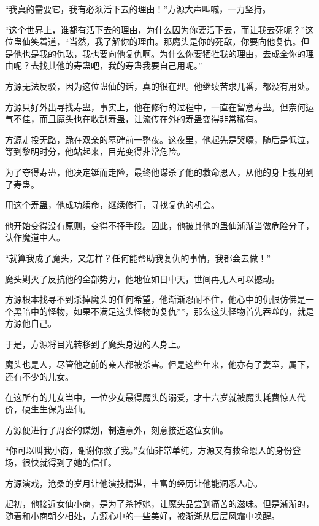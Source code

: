 
\begin{this_body}

“我真的需要它，我有必须活下去的理由！”方源大声叫喊，一力坚持。

“这个世界上，谁都有活下去的理由，为什么因为你要活下去，而让我去死呢？”这位蛊仙笑着道，“当然，我了解你的理由。那魔头是你的死敌，你要向他复仇。但是他也是我的仇敌，我也要向他复仇啊。为什么你要牺牲我的理由，去成全你的理由呢？去找其他的寿蛊吧，我的寿蛊我要自己用呢。”

方源无法反驳，因为这位蛊仙的话，真的很在理。他继续苦求几番，都没有用处。

方源只好外出寻找寿蛊，事实上，他在修行的过程中，一直在留意寿蛊。但奈何运气不佳，而且魔头也在收刮寿蛊，让流传在外的寿蛊变得非常稀有。

方源走投无路，跪在双亲的墓碑前一整夜。这夜里，他起先是哭嚎，随后是低泣，等到黎明时分，他站起来，目光变得非常危险。

为了夺得寿蛊，他决定铤而走险，最终他谋杀了他的救命恩人，从他的身上搜刮到了寿蛊。

用这个寿蛊，他成功续命，继续修行，寻找复仇的机会。

他开始变得没有原则，变得不择手段。因此，他被其他的蛊仙渐渐当做危险分子，认作魔道中人。

“就算我成了魔头，又怎样？任何能帮助我复仇的事情，我都会去做！”

魔头剿灭了反抗他的全部势力，他地位如日中天，世间再无人可以撼动。

方源根本找寻不到杀掉魔头的任何希望，他渐渐忍耐不住，他心中的仇恨仿佛是一个黑暗中的怪物，如果不满足这头怪物的复仇**，那么这头怪物首先吞噬的，就是方源他自己。

于是，方源将目光转移到了魔头身边的人身上。

魔头也是人，尽管他之前的亲人都被杀害。但是这些年来，他亦有了妻室，属下，还有不少的儿女。

在这所有的儿女当中，一位少女最得魔头的溺爱，才十六岁就被魔头耗费惊人代价，硬生生保为蛊仙。

方源便进行了周密的谋划，制造意外，刻意接近这位女仙。

“你可以叫我小商，谢谢你救了我。”女仙非常单纯，方源又有救命恩人的身份登场，很快就得到了她的信任。

方源演戏，沧桑的岁月让他演技精湛，丰富的经历让他能洞悉人心。

起初，他接近女仙小商，是为了杀掉她，让魔头品尝到痛苦的滋味。但是渐渐的，随着和小商朝夕相处，方源心中的一些美好，被渐渐从层层风霜中唤醒。


\end{this_body}
